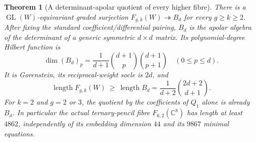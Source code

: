 \documentclass[11pt,reqno]{amsart}
\numberwithin{equation}{section}
\newtheorem{theorem}{Theorem}[section]
\theoremstyle{definition}\newtheorem{definition}[theorem]{Definition}
\theoremstyle{remark}\newtheorem{remark}[theorem]{Remark}
\newcommand{\C}{\mathbb C}\newcommand{\Q}{\mathbb Q}
\DeclareMathOperator{\length}{length}
\begin{document}
\begin{theorem}[A determinant-apolar quotient of every higher fibre]
\label{thm:apolar-quotient-v154}
There is a $\operatorname{GL}(W)$-equivariant graded surjection
$F_{g,k}(W)\twoheadrightarrow B_d$ for every $g\geq k\geq2$.
After fixing the standard coefficient/differential pairing, $B_d$
is the apolar algebra of the determinant of a generic symmetric
$d\times d$ matrix. Its polynomial-degree Hilbert function is
\begin{equation}\label{eq:Narayana-v154}
 \dim(B_d)_p=\frac{1}{d+1}\binom{d+1}{p}\binom{d+1}{p+1}
                 \quad(0\leq p\leq d).
\end{equation}
It is Gorenstein, its reciprocal-weight socle is $2d$, and
\begin{equation}\label{eq:Catalan-v154}
 \length F_{g,k}(W)\ \geq\ \length B_d
       =\frac{1}{d+2}\binom{2d+2}{d+1}.
\end{equation}
For $k=2$ and $g=2$ or $3$, the quotient by the coefficients of
$Q_1$ alone is already $B_d$.
In particular the actual ternary-pencil fibre $F_{6,2}(\C^8)$ has
length at least $4862$, independently of its embedding dimension
$44$ and its $9867$ minimal equations.
\end{theorem}
\end{document}
